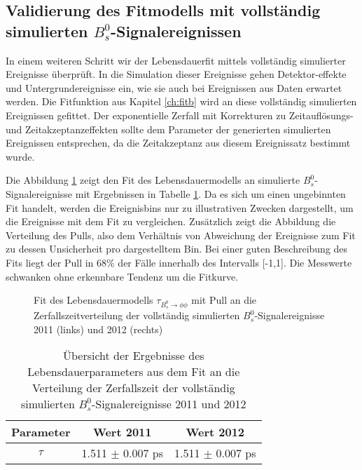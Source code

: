\documentclass{article}
\begin{document}
\subsection[Validierung des Fitmodells mit vollständig simulierten $B_s^0$-Signal-ereignissen]{Validierung des Fitmodells mit vollständig simulierten $B_s^0$-Signalereignissen}
\label{mcfit}
In einem weiteren Schritt wir der Lebensdauerfit mittels vollständig simulierter Ereignisse überprüft. In die Simulation dieser Ereignisse gehen Detektor-effekte und Untergrundereignisse ein, wie sie auch bei Ereignissen aus Daten erwartet werden. Die Fitfunktion aus Kapitel \ref{ch:fitb} wird an diese vollständig simulierten Ereignissen gefittet. Der exponentielle Zerfall mit Korrekturen zu Zeitauflösungs- und Zeitakzeptanzeffekten sollte dem Parameter der generierten simulierten Ereignissen entsprechen, da die Zeitakzeptanz aus diesem Ereignissatz bestimmt wurde. 

Die Abbildung \ref{fig:tauMC} zeigt den Fit des Lebensdauermodells an simulierte $B_s^0$-Signalereignisse mit Ergebnissen in Tabelle \ref{table:tauMCresults}. Da es sich um einen ungebinnten Fit handelt, werden die Ereignisbins nur zu illustrativen Zwecken dargestellt, um die Ereignisse mit dem Fit zu vergleichen. Zusätzlich zeigt die Abbildung die Verteilung des Pulls, also dem Verhältnis von Abweichung der Ereignisse zum Fit zu dessen Unsicherheit pro dargestelltem Bin. Bei einer guten Beschreibung des Fits liegt der Pull in 68\% der Fälle innerhalb des Intervalls [-1,1]. Die Messwerte schwanken ohne erkennbare Tendenz um die Fitkurve.


\begin{figure}[h!]
\caption{Fit des Lebensdauermodells $\tau_{B_s^0 \rightarrow \phi\phi}$ mit Pull an die Zerfallszeitverteilung der vollständig simulierten $B_s^0$-Signalereignisse 2011 (links) und 2012 (rechts)}
\label{fig:tauMC}
\end{figure} 

\begin{table}[h!]
\noindent \begin{centering}\begin{tabular}{c|c|c}
Parameter & Wert 2011 & Wert 2012 \tabularnewline
\hline 
$\tau$ & 1.511 $\pm$ 0.007 ps& 1.511 $\pm$ 0.007 ps \tabularnewline
\end{tabular}
\par \end{centering}
\caption{Übersicht der Ergebnisse des Lebensdauerparameters aus dem Fit an die Verteilung der Zerfallszeit der vollständig simulierten $B_s^0$-Signalereignisse 2011 und 2012}
\label{table:tauMCresults}
\end{table}
\end{document}

